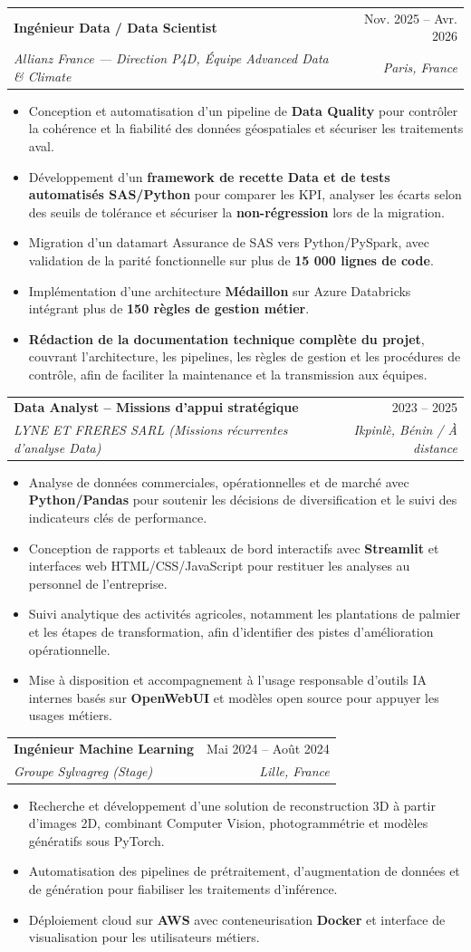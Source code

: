 \documentclass[letterpaper,11pt]{article}
\makeatletter
\newcommand{\resumeItem}[1]{
  \item\small{{#1 \vspace{-1.5pt}}}
}
\newcommand{\resumeSubheading}[4]{
  \vspace{1pt}\item
    \begin{tabular*}{0.97\textwidth}[t]{l@{\extracolsep{\fill}}r}
      {\color{primary}\textbf{#1}} & #2 \\
      \textit{\small#3} & \textit{\small #4} \\
    \end{tabular*}\vspace{-4pt}
}
\newcommand{\resumeItemListStart}{\begin{itemize}[leftmargin=0.15in, label={\small\textbullet}, itemsep=1.5pt, parsep=0pt, topsep=2pt, partopsep=0pt]}
\newcommand{\resumeItemListEnd}{\end{itemize}\vspace{-1pt}}
\makeatother
\begin{document}
\resumeSubheading
{Ingénieur Data / Data Scientist}{Nov. 2025 -- Avr. 2026}
{Allianz France --- Direction P4D, Équipe Advanced Data \& Climate}{Paris, France}
\resumeItemListStart
  \resumeItem{Conception et automatisation d'un pipeline de \textbf{Data Quality} pour contrôler la cohérence et la fiabilité des données géospatiales et sécuriser les traitements aval.}
  \resumeItem{Développement d'un \textbf{framework de recette Data et de tests automatisés SAS/Python} pour comparer les KPI, analyser les écarts selon des seuils de tolérance et sécuriser la \textbf{non-régression} lors de la migration.}
  \resumeItem{Migration d'un datamart Assurance de SAS vers Python/PySpark, avec validation de la parité fonctionnelle sur plus de \textbf{15 000 lignes de code}.}
  \resumeItem{Implémentation d'une architecture \textbf{Médaillon} sur Azure Databricks intégrant plus de \textbf{150 règles de gestion métier}.}
  \resumeItem{\textbf{Rédaction de la documentation technique complète du projet}, couvrant l'architecture, les pipelines, les règles de gestion et les procédures de contrôle, afin de faciliter la maintenance et la transmission aux équipes.}
\resumeItemListEnd

\resumeSubheading
{Data Analyst -- Missions d'appui stratégique}{2023 -- 2025}
{LYNE ET FRERES SARL \normalfont\small(Missions récurrentes d'analyse Data)}{Ikpinlè, Bénin / À distance}
\resumeItemListStart
  \resumeItem{Analyse de données commerciales, opérationnelles et de marché avec \textbf{Python/Pandas} pour soutenir les décisions de diversification et le suivi des indicateurs clés de performance.}
  \resumeItem{Conception de rapports et tableaux de bord interactifs avec \textbf{Streamlit} et interfaces web HTML/CSS/JavaScript pour restituer les analyses au personnel de l'entreprise.}
  \resumeItem{Suivi analytique des activités agricoles, notamment les plantations de palmier et les étapes de transformation, afin d'identifier des pistes d'amélioration opérationnelle.}
  \resumeItem{Mise à disposition et accompagnement à l'usage responsable d'outils IA internes basés sur \textbf{OpenWebUI} et modèles open source pour appuyer les usages métiers.}
\resumeItemListEnd

\resumeSubheading
{Ingénieur Machine Learning}{Mai 2024 -- Août 2024}
{Groupe Sylvagreg \normalfont\small(Stage)}{Lille, France} 
\resumeItemListStart
  \resumeItem{Recherche et développement d'une solution de reconstruction 3D à partir d'images 2D, combinant Computer Vision, photogrammétrie et modèles génératifs sous PyTorch.}
  \resumeItem{Automatisation des pipelines de prétraitement, d'augmentation de données et de génération pour fiabiliser les traitements d'inférence.}
  \resumeItem{Déploiement cloud sur \textbf{AWS} avec conteneurisation \textbf{Docker} et interface de visualisation pour les utilisateurs métiers.}
\resumeItemListEnd
\end{document}
